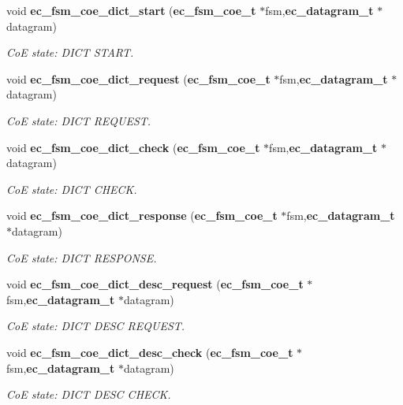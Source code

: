 \begin{DoxyCompactItemize}
\item 
void {\bf ec\-\_\-fsm\-\_\-coe\-\_\-dict\-\_\-start} ({\bf ec\-\_\-fsm\-\_\-coe\-\_\-t} $\ast$fsm,{\bf ec\-\_\-datagram\-\_\-t} $\ast$datagram)
\begin{DoxyCompactList}\small\item\em Co\-E state\-: D\-I\-C\-T S\-T\-A\-R\-T. \end{DoxyCompactList}\item 
void {\bf ec\-\_\-fsm\-\_\-coe\-\_\-dict\-\_\-request} ({\bf ec\-\_\-fsm\-\_\-coe\-\_\-t} $\ast$fsm,{\bf ec\-\_\-datagram\-\_\-t} $\ast$datagram)
\begin{DoxyCompactList}\small\item\em Co\-E state\-: D\-I\-C\-T R\-E\-Q\-U\-E\-S\-T. \end{DoxyCompactList}\item 
void {\bf ec\-\_\-fsm\-\_\-coe\-\_\-dict\-\_\-check} ({\bf ec\-\_\-fsm\-\_\-coe\-\_\-t} $\ast$fsm,{\bf ec\-\_\-datagram\-\_\-t} $\ast$datagram)
\begin{DoxyCompactList}\small\item\em Co\-E state\-: D\-I\-C\-T C\-H\-E\-C\-K. \end{DoxyCompactList}\item 
void {\bf ec\-\_\-fsm\-\_\-coe\-\_\-dict\-\_\-response} ({\bf ec\-\_\-fsm\-\_\-coe\-\_\-t} $\ast$fsm,{\bf ec\-\_\-datagram\-\_\-t} $\ast$datagram)
\begin{DoxyCompactList}\small\item\em Co\-E state\-: D\-I\-C\-T R\-E\-S\-P\-O\-N\-S\-E. \end{DoxyCompactList}\item 
void {\bf ec\-\_\-fsm\-\_\-coe\-\_\-dict\-\_\-desc\-\_\-request} ({\bf ec\-\_\-fsm\-\_\-coe\-\_\-t} $\ast$fsm,{\bf ec\-\_\-datagram\-\_\-t} $\ast$datagram)
\begin{DoxyCompactList}\small\item\em Co\-E state\-: D\-I\-C\-T D\-E\-S\-C R\-E\-Q\-U\-E\-S\-T. \end{DoxyCompactList}\item 
void {\bf ec\-\_\-fsm\-\_\-coe\-\_\-dict\-\_\-desc\-\_\-check} ({\bf ec\-\_\-fsm\-\_\-coe\-\_\-t} $\ast$fsm,{\bf ec\-\_\-datagram\-\_\-t} $\ast$datagram)
\begin{DoxyCompactList}\small\item\em Co\-E state\-: D\-I\-C\-T D\-E\-S\-C C\-H\-E\-C\-K. \end{DoxyCompactList}\item 

\end{DoxyCompactItemize}
